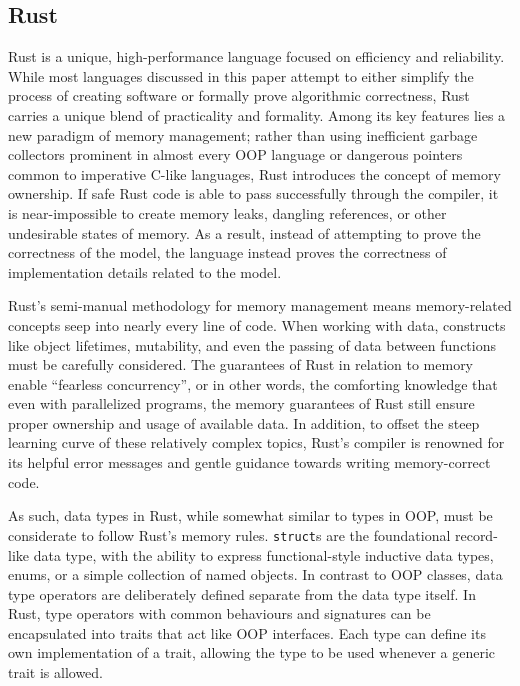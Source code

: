 \documentclass{article}
\begin{document}
\subsection{Rust}

Rust is a unique, high-performance language focused on efficiency and reliability.
While most languages discussed in this paper attempt to either simplify the process of creating software or
formally prove algorithmic correctness, Rust carries a unique blend of practicality and formality.
Among its key features lies a new paradigm of memory management;
rather than using inefficient garbage collectors prominent in almost every OOP language
or dangerous pointers common to imperative C-like languages, Rust introduces the concept of memory ownership.
If safe Rust code is able to pass successfully through the compiler,
it is near-impossible to create memory leaks, dangling references, or other undesirable states of memory.
As a result, instead of attempting to prove the correctness of the model, the language instead proves the correctness
of implementation details related to the model.

Rust's semi-manual methodology for memory management means memory-related concepts seep into nearly every line of code.
When working with data, constructs like object lifetimes, mutability, and even the passing of data between functions
must be carefully considered. The guarantees of Rust in relation to memory enable ``fearless concurrency'', or in other words,
the comforting knowledge that even with parallelized programs, the memory guarantees of Rust still ensure proper
ownership and usage of available data. In addition, to offset the steep learning curve of these relatively complex topics,
Rust's compiler is renowned for its helpful error messages and gentle guidance towards writing memory-correct code.

As such, data types in Rust, while somewhat similar to types in OOP, must be considerate to follow Rust's memory rules.
\texttt{struct}s are the foundational record-like data type, with the ability to express functional-style inductive data types,
enums, or a simple collection of named objects. In contrast to OOP classes, data type operators
are deliberately defined separate from the data type itself. In Rust, type operators with common behaviours and signatures
can be encapsulated into traits that act like OOP interfaces. Each type can define its own implementation of a trait,
allowing the type to be used whenever a generic trait is allowed.
\end{document}
